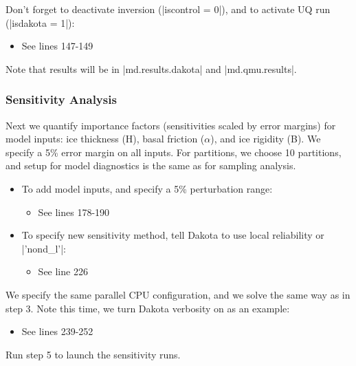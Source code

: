 Don't forget to deactivate inversion (\lstinlinebg|iscontrol = 0|), and to activate UQ run (\lstinlinebg|isdakota = 1|):
\begin{itemize}
	\item See lines 147-149
\end{itemize}

Note that results will be in \lstinlinebg|md.results.dakota| and \lstinlinebg|md.qmu.results|.
\subsubsection{Sensitivity Analysis} %
Next we quantify importance factors (sensitivities scaled by error margins) for model inputs: ice thickness (H), basal friction ($\alpha$), and ice rigidity (B). We specify a 5\% error margin on all inputs. For partitions, we choose 10 partitions, and setup for model diagnostics is the same as for sampling analysis.
\begin{itemize}
	\item To add model inputs, and specify a 5\% perturbation range:
		\begin{itemize}
			\item See lines 178-190
		\end{itemize}
	\item To specify new sensitivity method, tell Dakota to use local reliability or \lstinlinebg|'nond_l'|:
		\begin{itemize}
			\item See line 226
		\end{itemize}
\end{itemize}

We specify the same parallel CPU configuration, and we solve the same way as in step 3. Note this time, we turn Dakota verbosity on as an example:
\begin{itemize}
	\item See lines 239-252
\end{itemize}

Run step 5 to launch the sensitivity runs.
